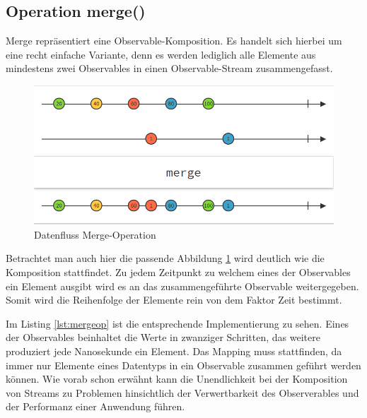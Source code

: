 \subsection{Operation merge()}
Merge repräsentiert eine Observable-Komposition. Es handelt sich hierbei um eine recht einfache Variante, denn es werden lediglich alle Elemente aus mindestens zwei Observables in einen Observable-Stream zusammengefasst. 
\begin{figure}[hbt]
	\centering
	\includegraphics[width=1\textwidth]{Abb/merge}
	\caption{Datenfluss Merge-Operation}
	\label{pic:merge}
\end{figure}
Betrachtet man auch hier die passende Abbildung \ref{pic:merge} wird deutlich wie die Komposition stattfindet. Zu jedem Zeitpunkt zu welchem eines der Observables ein Element ausgibt wird es an das zusammengeführte Observable weitergegeben. Somit wird die Reihenfolge der Elemente rein von dem Faktor Zeit bestimmt.
 
Im Listing \ref{lst:mergeop} ist die entsprechende Implementierung zu sehen. Eines der Observables beinhaltet die Werte in zwanziger Schritten, das weitere produziert jede Nanosekunde ein Element. Das Mapping muss stattfinden, da immer nur Elemente eines Datentyps in ein Observable zusammen geführt werden können. Wie vorab schon erwähnt kann die Unendlichkeit bei der Komposition von Streams zu Problemen hinsichtlich der Verwertbarkeit des Observerables und der Performanz einer Anwendung führen.
